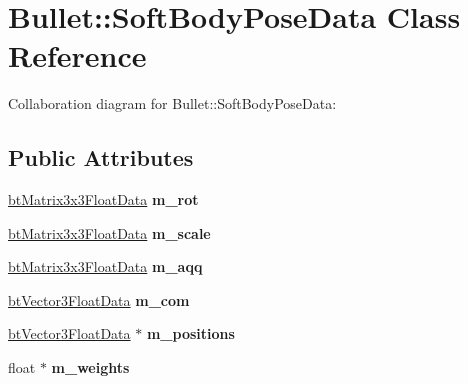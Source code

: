 \hypertarget{class_bullet_1_1_soft_body_pose_data}{\section{Bullet\+:\+:Soft\+Body\+Pose\+Data Class Reference}
\label{class_bullet_1_1_soft_body_pose_data}
}


Collaboration diagram for Bullet\+:\+:Soft\+Body\+Pose\+Data\+:
\subsection*{Public Attributes}
\begin{DoxyCompactItemize}
\item 
\hypertarget{class_bullet_1_1_soft_body_pose_data_ad01d5b4f38a320c405cd9bd18c996129}{\hyperlink{class_bullet_1_1bt_matrix3x3_float_data}{bt\+Matrix3x3\+Float\+Data} {\bfseries m\+\_\+rot}}\label{class_bullet_1_1_soft_body_pose_data_ad01d5b4f38a320c405cd9bd18c996129}

\item 
\hypertarget{class_bullet_1_1_soft_body_pose_data_a99734bb5a232aecb8bac8307b6a91c79}{\hyperlink{class_bullet_1_1bt_matrix3x3_float_data}{bt\+Matrix3x3\+Float\+Data} {\bfseries m\+\_\+scale}}\label{class_bullet_1_1_soft_body_pose_data_a99734bb5a232aecb8bac8307b6a91c79}

\item 
\hypertarget{class_bullet_1_1_soft_body_pose_data_ae4ac473f9560f7d9a86a27e11857c4c7}{\hyperlink{class_bullet_1_1bt_matrix3x3_float_data}{bt\+Matrix3x3\+Float\+Data} {\bfseries m\+\_\+aqq}}\label{class_bullet_1_1_soft_body_pose_data_ae4ac473f9560f7d9a86a27e11857c4c7}

\item 
\hypertarget{class_bullet_1_1_soft_body_pose_data_a6b93f67a4daea8dd6ffa576d950e3f85}{\hyperlink{class_bullet_1_1bt_vector3_float_data}{bt\+Vector3\+Float\+Data} {\bfseries m\+\_\+com}}\label{class_bullet_1_1_soft_body_pose_data_a6b93f67a4daea8dd6ffa576d950e3f85}

\item 
\hypertarget{class_bullet_1_1_soft_body_pose_data_a1b3e4bc77497f2f8156457fb834326f1}{\hyperlink{class_bullet_1_1bt_vector3_float_data}{bt\+Vector3\+Float\+Data} $\ast$ {\bfseries m\+\_\+positions}}\label{class_bullet_1_1_soft_body_pose_data_a1b3e4bc77497f2f8156457fb834326f1}

\item 
\hypertarget{class_bullet_1_1_soft_body_pose_data_a2b284863d24f420b5e761170bf6ed649}{float $\ast$ {\bfseries m\+\_\+weights}}\label{class_bullet_1_1_soft_body_pose_data_a2b284863d24f420b5e761170bf6ed649}


\end{DoxyCompactItemize}
